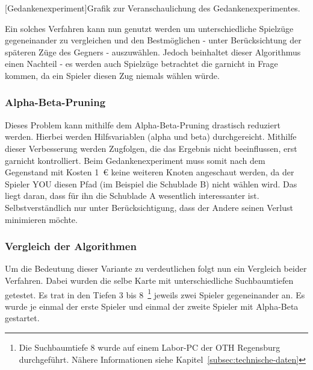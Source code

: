 \vspace{1em}
\begin{center}
    [Gedankenexperiment]{Grafik zur Veranschaulichung des Gedankenexperimentes.}
    \label{fig:thought-experiment}
\end{center}

Ein solches Verfahren kann nun genutzt werden um unterschiedliche Spielz\"uge gegeneinander zu vergleichen und den Bestm\"oglichen - unter Ber\"ucksichtung der sp\"ateren Z\"uge des Gegners - auszuw\"ahlen.
Jedoch beinhaltet dieser Algorithmus einen Nachteil - es werden auch Spielz\"uge betrachtet die garnicht in Frage kommen, da ein Spieler diesen Zug niemals w\"ahlen w\"urde.

\subsubsection{Alpha-Beta-Pruning}
Dieses Problem kann mithilfe dem Alpha-Beta-Pruning drastisch reduziert werden.
Hierbei werden Hilfsvariablen (alpha und beta) durchgereicht.
Mithilfe dieser Verbesserung werden Zugfolgen, die das Ergebnis nicht beeinflussen, erst garnicht kontrolliert.
Beim Gedankenexperiment muss somit nach dem Gegenstand mit Kosten 1~\euro{} keine weiteren Knoten angeschaut werden, da der Spieler YOU diesen Pfad (im Beispiel die Schublade B) nicht w\"ahlen wird.
Das liegt daran, dass f\"ur ihn die Schublade A wesentlich interessanter ist.
Selbstverst\"andlich nur unter Ber\"ucksichtigung, dass der Andere seinen Verlust minimieren m\"ochte.

\subsubsection{Vergleich der Algorithmen}
Um die Bedeutung dieser Variante zu verdeutlichen folgt nun ein Vergleich beider Verfahren.
Dabei wurden die selbe Karte mit unterschiedliche Suchbaumtiefen getestet.
Es trat in den Tiefen 3 bis 8~\footnote{Die Suchbaumtiefe 8 wurde auf einem Labor-PC der OTH Regensburg durchgef\"uhrt. N\"ahere Informationen siehe Kapitel~\ref{subsec:technische-daten}} jeweils zwei Spieler gegeneinander an.
Es wurde je einmal der erste Spieler und einmal der zweite Spieler mit Alpha-Beta gestartet.

